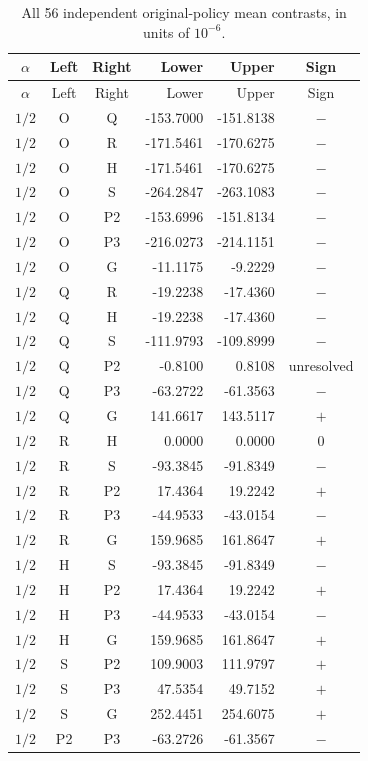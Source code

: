 \small\begin{longtable}{cccrrc}
\caption{All 56 independent original-policy mean contrasts, in units of $10^{-6}$.}\label{tab:contrasts56d}\\
\hline $\alpha$ & Left & Right & Lower & Upper & Sign \\ \hline\endfirsthead
\hline $\alpha$ & Left & Right & Lower & Upper & Sign \\ \hline\endhead
$1/2$ & O & Q & -153.7000 & -151.8138 & $-$ \\
$1/2$ & O & R & -171.5461 & -170.6275 & $-$ \\
$1/2$ & O & H & -171.5461 & -170.6275 & $-$ \\
$1/2$ & O & S & -264.2847 & -263.1083 & $-$ \\
$1/2$ & O & P2 & -153.6996 & -151.8134 & $-$ \\
$1/2$ & O & P3 & -216.0273 & -214.1151 & $-$ \\
$1/2$ & O & G & -11.1175 & -9.2229 & $-$ \\
$1/2$ & Q & R & -19.2238 & -17.4360 & $-$ \\
$1/2$ & Q & H & -19.2238 & -17.4360 & $-$ \\
$1/2$ & Q & S & -111.9793 & -109.8999 & $-$ \\
$1/2$ & Q & P2 & -0.8100 & 0.8108 & unresolved \\
$1/2$ & Q & P3 & -63.2722 & -61.3563 & $-$ \\
$1/2$ & Q & G & 141.6617 & 143.5117 & $+$ \\
$1/2$ & R & H & 0.0000 & 0.0000 & $0$ \\
$1/2$ & R & S & -93.3845 & -91.8349 & $-$ \\
$1/2$ & R & P2 & 17.4364 & 19.2242 & $+$ \\
$1/2$ & R & P3 & -44.9533 & -43.0154 & $-$ \\
$1/2$ & R & G & 159.9685 & 161.8647 & $+$ \\
$1/2$ & H & S & -93.3845 & -91.8349 & $-$ \\
$1/2$ & H & P2 & 17.4364 & 19.2242 & $+$ \\
$1/2$ & H & P3 & -44.9533 & -43.0154 & $-$ \\
$1/2$ & H & G & 159.9685 & 161.8647 & $+$ \\
$1/2$ & S & P2 & 109.9003 & 111.9797 & $+$ \\
$1/2$ & S & P3 & 47.5354 & 49.7152 & $+$ \\
$1/2$ & S & G & 252.4451 & 254.6075 & $+$ \\
$1/2$ & P2 & P3 & -63.2726 & -61.3567 & $-$ \\

\end{longtable}
